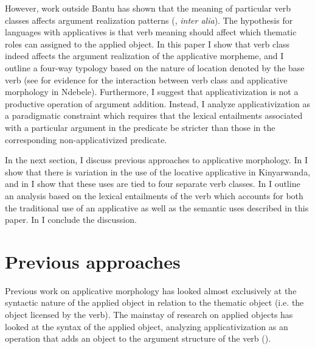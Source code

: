 \documentclass[output=paper]{langsci/langscibook}
\begin{document}
 However, work outside Bantu has shown that the meaning of particular verb classes affects argument realization patterns (\citealt{fillmore:1970,levin:1993,lrh:2008a,beavers:2011a}, \emph{inter alia}). The hypothesis for languages with applicatives is that verb meaning should affect which thematic roles can assigned to the applied object. In this paper I show that verb class indeed affects the argument realization of the applicative morpheme, and I outline a four-way typology based on the nature of location denoted by the base verb (see \citet{sibanda:2016} for evidence for the interaction between verb class and applicative morphology in Ndebele). Furthermore, I suggest that applicativization is not a productive operation of argument addition. Instead, I analyze applicativization as a paradigmatic constraint which requires that the lexical entailments associated with a particular argument in the predicate be stricter than those in the corresponding non-applicativized predicate.
 
 
In the next section, I discuss previous approaches to applicative morphology. In  I show that there is variation in the use of the locative applicative in Kinyarwanda, and in  I show that these uses are tied to four separate verb classes. In  I outline an analysis based on the lexical entailments of the verb which accounts for both the traditional use of an applicative as well as the semantic uses described in this paper. In  I conclude the discussion.
	 
 

\section{Previous approaches}\label{sec:jerro:2} %
 

 Previous work on applicative morphology has looked almost exclusively at the syntactic nature of the applied object in relation to the thematic object (i.e. the object licensed by the verb). The mainstay of research on applied objects has looked at the syntax of the applied object, analyzing applicativization as an operation that adds an object to the argument structure of the verb (\citealt{baker:1988,bresnan:1990,alsina:1992,alsina:1993,marantz:1993,pylkkanen:2008, mcginnis:2001,mcginnis:2003,baker:2006,zeller:2006,zellerngoboka:2006,peterson:2007, jeong:2007,bakeretal:2012,jerro:2015}).  
  
\end{document}
